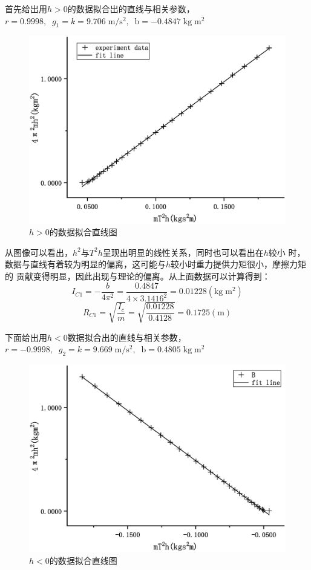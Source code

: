 \documentclass[a4paper]{ctexart}
\begin{document}
    \par 
    首先给出用$h>0$的数据拟合出的直线与相关参数，$r = 0.9998,\;\;g_{1} = k = 9.706\;\mathrm{m/s^{2},\;\; b = -0.4847\;\mathrm{kg\;m^{2}}}$
    \begin{figure}[htbp]
        \centering
        \includegraphics[scale=0.43]{h+line.eps}
        \caption{$h>0$的数据拟合直线图}
    \end{figure}
    \par 
    从图像可以看出，$h^{2}$与$T^{2}h$呈现出明显的线性关系，同时也可以看出在$h$较小
    时，数据与直线有着较为明显的偏离，这可能与$h$较小时重力提供力矩很小，摩擦力矩的
    贡献变得明显，因此出现与理论的偏离。从上面数据可以计算得到：
    $$
    I_{C1} = -\frac{b}{4\pi^{2}} = \frac{0.4847}{4\times 3.1416^{2}} = 0.01228(\mathrm{kg\;m^{2}})
    $$
    $$
    R_{C1} = \sqrt{\frac{I_{c}}{m}} = \sqrt{\frac{0.01228}{0.4128}} = 0.1725(\mathrm{m})
    $$
    \par 
    下面给出用$h<0$数据拟合出的直线与相关参数，$r = -0.9998,\;\;g_{2} = k = 9.669\;\mathrm{m/s^{2},\;\; b = 0.4805 \;\mathrm{kg\;m^{2}}}$
    \begin{figure}[htbp]
        \centering
        \includegraphics[scale=0.43]{h-line.eps}
        \caption{$h<0$的数据拟合直线图}
    \end{figure}
\end{document}
